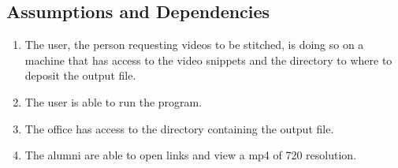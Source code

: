 \subsection{Assumptions and Dependencies}
%
\begin{enumerate}
    \item The user, the person requesting videos to be stitched, is doing 
    so on a machine that has access to the video snippets and the directory 
    to where to deposit the output file.
    \item The user is able to run the program.
    \item The office has access to the directory containing the output file.
    \item The alumni are able to open links and view a mp4 of 720 resolution.
\end{enumerate}
